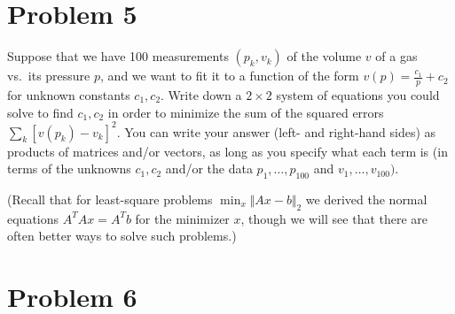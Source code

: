 \documentclass[12pt]{article}
\newcommand{\sol}[1]{}
\newcommand{\sol}[1]{{\color{red} \textbf{Solution: } #1}}
\begin{document}
\newpage

\section*{Problem 5}

Suppose that we have 100 measurements $(p_{k},v_{k})$ of the volume $v$ of a gas vs.~its pressure $p$, and we want to fit it to a function of the form $v(p)=\frac{c_{1}}{p}+c_{2}$ for unknown constants $c_{1},c_{2}$. Write down a $2\times2$ system of equations you could solve to find $c_{1},c_{2}$ in order to minimize the sum of the squared errors $\sum_{k}[v(p_{k})-v_{k}]^{2}$. You can write your answer (left- and right-hand sides) as products of matrices and/or vectors, as long as you specify what each term is (in terms of the unknowns $c_{1},c_{2}$ and/or the data $p_{1},\ldots,p_{100}$ and $v_{1},\ldots,v_{100})$.

(Recall that for least-square problems $\min_x \Vert Ax - b\Vert_2$ we derived the normal equations $A^T Ax=A^T b$ for the minimizer $x$, though we will see that there are often better ways to solve such problems.)

\sol{This is a least-square problem, so the answer is
to solve the normal equations $\boxed{A^{T}Ac=A^{T}b}$ for $c=\left(\begin{array}{cc}
c_{1} & c_{2}\end{array}\right)^{T}$ where 
\[
\boxed{A=\left(\begin{array}{cc}
\frac{1}{p_{1}} & 1\\
\frac{1}{p_{2}} & 1\\
\vdots & \vdots\\
\frac{1}{p_{100}} & 1
\end{array}\right)}\text{ and }\boxed{b=\left(\begin{array}{c}
v_{1}\\
v_{2}\\
\vdots\\
v_{100}
\end{array}\right)}
\]
so that $Ac$ is the ``model'' $\left(\begin{array}{c}
v(p_{1})\\
v(p_{2})\\
\vdots\\
v(p_{100})
\end{array}\right)$ and $b$ are the data we are fitting to, so that $\sum_{k}[v(p_{k})-v_{k}]^{2}=\Vert Ac-b\Vert^{2}$. 
}

\newpage
\section*{Problem 6}
\end{document}
